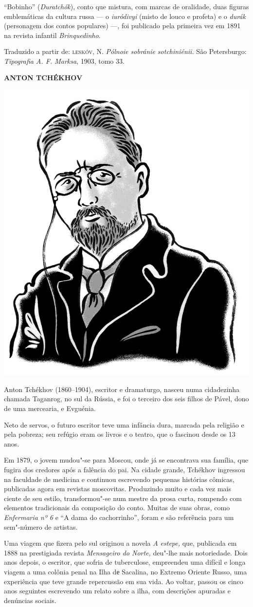 ``Bobinho'' (\emph{Duratchók}), conto que mistura, com marcas
de oralidade, duas figuras
emblemáticas da cultura russa --- o \emph{iuródivyi} (misto de louco e
profeta) e o \emph{durák} (personagem dos contos populares) ---, foi
publicado pela primeira vez em 1891 na revista infantil
\emph{Brinquedinho}. 

Traduzido a partir de:
\textsc{leskóv}, N. \emph{Pólnoie sobránie sotchiniénii.} São Petersburgo:
\emph{Tipografia A. F. Marksa}, 1903, tomo 33.

\pagebreak
\noindent\textbf{ANTON TCHÉKHOV}\medskip

\noindent\includegraphics[width=.8in]{./imgs/autor6.jpg}

\noindent{}Anton Tchékhov (1860--1904), escritor e dramaturgo, nasceu numa
cidadezinha chamada Taganrog, no sul da Rússia, e foi o terceiro dos
seis filhos de Pável, dono de uma mercearia, e Evguénia.

Neto de servos, o futuro escritor teve uma infância dura, marcada pela
religião e pela pobreza; seu refúgio eram os livros e o teatro, que o
fascinou desde os 13 anos.

Em 1879, o jovem mudou"-se para Moscou, onde já se encontrava sua
família, que fugira dos credores após a falência do pai. Na cidade
grande, Tchékhov ingressou na faculdade de medicina e continuou
escrevendo pequenas histórias cômicas, publicadas agora em revistas
moscovitas. Produzindo muito e cada vez mais ciente de seu estilo,
transformou"-se num mestre da prosa curta, rompendo com elementos
tradicionais da composição do conto. Muitas de suas obras, como
\emph{Enfermaria nº 6} e ``A dama do cachorrinho'', foram e são
referência para um sem"-número de artistas.

Uma viagem que fizera pelo sul originou a novela \emph{A estepe,}
que, publicada em 1888 na prestigiada revista \emph{Mensageiro do
Norte,} deu"-lhe mais notoriedade. Dois anos depois, o escritor, que
sofria de tuberculose, empreendeu uma difícil e longa viagem a uma
colônia penal na Ilha dе Sacalina, no Extremo Oriente Russo, uma
experiência que teve grande repercussão em sua vida. Ao voltar, passou
os cinco anos seguintes escrevendo um relato sobre a ilha, com
descrições apuradas e denúncias sociais.

